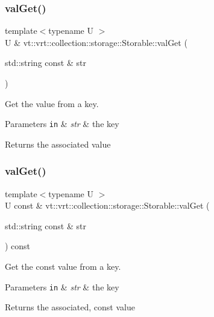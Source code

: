\subsubsection{\texorpdfstring{val\+Get()}{valGet()}\hspace{0.1cm}{\footnotesize\ttfamily [1/2]}}
{\footnotesize\ttfamily template$<$typename U $>$ \\
U \& vt\+::vrt\+::collection\+::storage\+::\+Storable\+::val\+Get (\begin{DoxyParamCaption}\item[{std\+::string const \&}]{str }\end{DoxyParamCaption})}



Get the value from a key. 


\begin{DoxyParams}[1]{Parameters}
\mbox{\tt in}  & {\em str} & the key\\
\hline
\end{DoxyParams}
\begin{DoxyReturn}{Returns}
the associated value 
\end{DoxyReturn}
\mbox{\label{structvt_1_1vrt_1_1collection_1_1storage_1_1_storable_a5014622ff587047270462efeca4ca2dd}} 
\subsubsection{\texorpdfstring{val\+Get()}{valGet()}\hspace{0.1cm}{\footnotesize\ttfamily [2/2]}}
{\footnotesize\ttfamily template$<$typename U $>$ \\
U const  \& vt\+::vrt\+::collection\+::storage\+::\+Storable\+::val\+Get (\begin{DoxyParamCaption}\item[{std\+::string const \&}]{str }\end{DoxyParamCaption}) const}



Get the const value from a key. 


\begin{DoxyParams}[1]{Parameters}
\mbox{\tt in}  & {\em str} & the key\\
\hline
\end{DoxyParams}
\begin{DoxyReturn}{Returns}
the associated, const value 
\end{DoxyReturn}
\mbox{\label{structvt_1_1vrt_1_1collection_1_1storage_1_1_storable_a8c0cbce1b3e261dd375d431a56a7c350}} 

